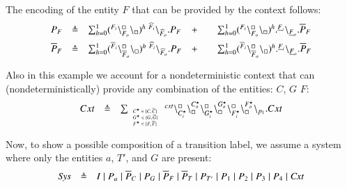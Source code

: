 The encoding of the entity $F$ that can be provided by the context follows:
\[
\begin{array}{lcllcl}
P_F&\triangleq & \sum_{h=0}^1 ({}^{F_i}\backslash_{F_o}^{\scriptstyle {\square}}\backslash_{\scriptstyle {\square}})^h\ {}^{\widehat{F}_i} \backslash_{\widehat{F}_o}.P_F
& +  && \sum_{h=0}^1 ({}^{F_i}\backslash_{F_o}^{\scriptstyle {\square}}\backslash_{\scriptstyle {\square}})^h. {}^{\underline{F}_i} \backslash_{\underline{F}_o}.\overline{P}_F \\[6pt]
\overline{P}_F&\triangleq & \sum_{h=0}^1 ({}^{\overline{F}_i}\backslash_{\overline{F}_o}^{\scriptstyle {\square}}\backslash_{\scriptstyle {\square}})^h\ {}^{\widehat{F}_i} \backslash_{\widehat{F}_o}.P_F
& +  && \sum_{h=0}^1 ({}^{\overline{F}_i}\backslash_{\overline{F}_o}^{\scriptstyle {\square}}\backslash_{\scriptstyle {\square}})^h. {}^{\underline{F}_i} \backslash_{\underline{F}_o}.\overline{P}_F \\
\end{array}
\]

Also in this example we account for a nondeterministic context that can (nondeterministically) provide any combination of the entities: $C$, $G$ $F$:
\[
\begin{array}{lcl}
 Cxt & \triangleq &
 \sum_{\tiny \begin{array}{l}C^{\star} \in \{C,\overline{C}\}\\G^{\star} \in \{G,\overline{G}\}\\
 F^{\star} \in \{F,\overline{F}\}
  \end{array}}
 {}^{cxt} \backslash_{C_i^{\star}}^{\scriptstyle {\square}}\backslash_{\scriptstyle {\square}}^{C_o^{\star}}\backslash_{G_i^{\star}}^{\scriptstyle {\square}}\backslash_{\scriptstyle {\square}}^{G_o^{\star}}
 \backslash_{F_i^{\star}}^{\scriptstyle {\square}}\backslash_{\scriptstyle {\square}}^{F_o^{\star}}\backslash_{p_1}.Cxt\\
\end{array}
\]

Now, to show a possible composition of a transition label, we assume a system where only the entities $a$, $T'$, and $G$ are present:
\[
\begin{array}{lcl}
\mathit{Sys} &\defeq &%
I\mid P_a\mid \overline{P}_C\mid P_G\mid \overline{P}_F \mid \overline{P}_T \mid P_{T'} \mid P_1 \mid P_2 \mid P_3 \mid P_4 \mid \mathit{Cxt}
\end{array}
\]

